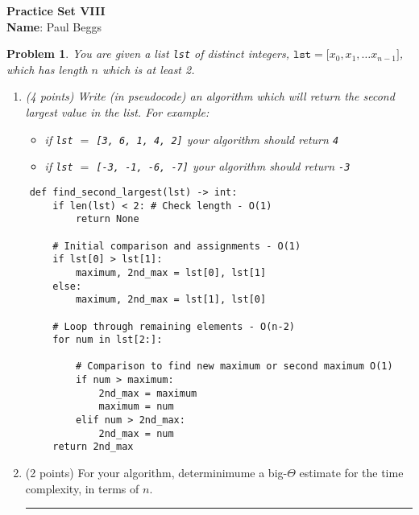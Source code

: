 \documentclass{article}
\newenvironment{solution}{\textit{Solution}.}
\theoremstyle{upright}
\newtheorem{problem}{Problem}
\def \proofDistance {5pt}
\newcommand{\proofseparator}{\par\noindent\rule{\textwidth}{0.4pt}}
\newcommand{\pb}[1]{
    \begin{problem}
    #1
    \end{problem}
}
\newcommand{\sol}[1]{
    \vspace{\proofDistance}
    \begin{customframedproof}
        \begin{solution}
        #1
        \end{solution}
    \end{customframedproof}
    \proofseparator
}
\begin{document}
\begin{center}
    \textbf{Practice Set VIII} \\
    
    \textbf{Name}: Paul Beggs \\
\end{center}

\pb{
You are given a list \texttt{lst} of distinct integers, $\texttt{lst} = \texttt{[}x_0,x_1,\dots x_{n-1}\texttt{]}$, which has length $n$ which is at least 2.
\begin{enumerate}
    \item (4 points) Write (in pseudocode) an algorithm which will return the \textit{second} largest value in the list. For example: \begin{itemize}
        \item if \texttt{lst} $=$ \texttt{[3, 6, 1, 4, 2]} your algorithm should return \texttt{4}
        \item if \texttt{lst} $=$ \texttt{[-3, -1, -6, -7]} your algorithm should return \texttt{-3}
    \end{itemize}
\end{enumerate}
}

    \vspace{0.5cm}

\begin{lstlisting}
    def find_second_largest(lst) -> int:
        if len(lst) < 2: # Check length - O(1)
            return None
            
        # Initial comparison and assignments - O(1)
        if lst[0] > lst[1]:
            maximum, 2nd_max = lst[0], lst[1]
        else:
            maximum, 2nd_max = lst[1], lst[0]
            
        # Loop through remaining elements - O(n-2)
        for num in lst[2:]:
        
            # Comparison to find new maximum or second maximum O(1)
            if num > maximum:
                2nd_max = maximum 
                maximum = num  
            elif num > 2nd_max:
                2nd_max = num  
        return 2nd_max
\end{lstlisting}

    
    \vspace{1cm}

\begin{enumerate}
    \setcounter{enumi}{1}
    \item (2 points) For your algorithm, determinimume a big-$\Theta$ estimate for the time complexity, in terms of $n$.
    \sol{
    $\Theta(n)$
    }
\end{enumerate}
\end{document}
